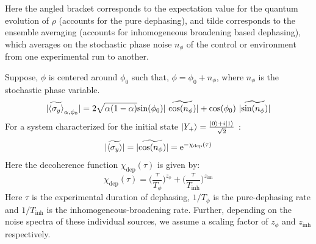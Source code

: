 Here the angled bracket corresponds to the expectation value for the quantum evolution of $\rho$ (accounts for the pure dephasing), and tilde corresponds to the ensemble averaging (accounts for inhomogeneous broadening based dephasing), which averages on the stochastic phase noise $n_{\phi}$ of the control or environment from one experimental run to another. 

Suppose, $\phi$ is centered around $\phi_{0}$ such that, $\phi=\phi_{0} + n_{\phi}$, where $n_{\phi}$ is the stochastic phase variable.
\begin{equation}
     |\widetilde{\langle\sigma_{y}\rangle}_{\alpha,\phi_{0}}| = 2\sqrt{\alpha(1-\alpha)}\text{sin}(\phi_{0})|~\widetilde{\text{cos}(n_{\phi})}| + \text{cos}(\phi_{0})~|\widetilde{\text{sin}(n_{\phi})}|
\end{equation}
For a system characterized for the initial state  $\ket{Y_{+}}=\frac{\ket{0}+i\ket{1}}{\sqrt{2}}$ \cite{Biercuk_2011}:
\begin{equation}
    |\widetilde{\langle\sigma_{y}\rangle}| = |\widetilde{\text{cos}(n_{\phi})}| = \text{e}^{-\chi_{\text{dep}}(\tau)}
\end{equation}
Here the decoherence function $\chi_{\text{dep}}(\tau)$ is given by:
\begin{equation}
    \chi_{\text{dep}}(\tau) = \bigg(\frac{\tau}{T_{\phi}}\bigg)^{z_{\phi}} + \bigg(\frac{\tau}{T_{\text{inh}}}\bigg)^{z_{\text{inh}}}
\end{equation}
Here $\tau$ is the experimental duration of dephasing, $1/T_{\phi}$ is the pure-dephasing rate and $1/T_{\text{inh}}$ is the inhomogeneous-broadening rate. Further, depending on the noise spectra of these individual sources, we assume a scaling factor of $z_{\phi}$ and $z_{\text{inh}}$ respectively.

